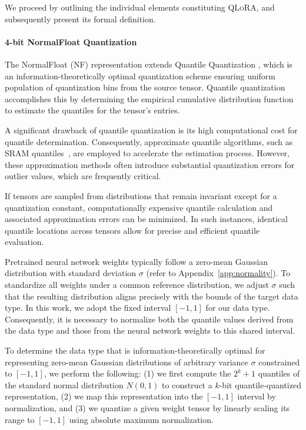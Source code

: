We proceed by outlining the individual elements constituting \textsc{QLoRA}, and subsequently present its formal definition.

\paragraph{4-bit NormalFloat Quantization} The NormalFloat (NF) representation extends Quantile Quantization \citep{dettmers2022optimizers}, which is an information-theoretically optimal quantization scheme ensuring uniform population of quantization bins from the source tensor. Quantile quantization accomplishes this by determining the empirical cumulative distribution function to estimate the quantiles for the tensor's entries.

A significant drawback of quantile quantization is its high computational cost for quantile determination. Consequently, approximate quantile algorithms, such as SRAM quantiles~\citep{dettmers2022optimizers}, are employed to accelerate the estimation process. However, these approximation methods often introduce substantial quantization errors for outlier values, which are frequently critical.

If tensors are sampled from distributions that remain invariant except for a quantization constant, computationally expensive quantile calculation and associated approximation errors can be minimized. In such instances, identical quantile locations across tensors allow for precise and efficient quantile evaluation.

Pretrained neural network weights typically follow a zero-mean Gaussian distribution with standard deviation $\sigma$ (refer to Appendix~\ref{app:normality}). To standardize all weights under a common reference distribution, we adjust $\sigma$ such that the resulting distribution aligns precisely with the bounds of the target data type. In this work, we adopt the fixed interval $[-1, 1]$ for our data type. Consequently, it is necessary to normalize both the quantile values derived from the data type and those from the neural network weights to this shared interval.

To determine the data type that is information-theoretically optimal for representing zero-mean Gaussian distributions of arbitrary variance $\sigma$ constrained to $[-1, 1]$, we perform the following: (1) we first compute the $2^k+1$ quantiles of the standard normal distribution $N(0, 1)$ to construct a $k$-bit quantile-quantized representation, (2) we map this representation into the $[-1, 1]$ interval by normalization, and (3) we quantize a given weight tensor by linearly scaling its range to $[-1, 1]$ using absolute maximum normalization.

